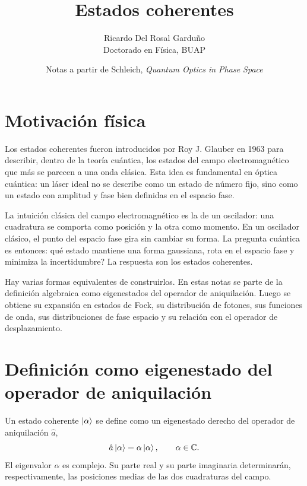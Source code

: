 \documentclass[11pt]{article}
\title{Estados coherentes}
\author{Ricardo Del Rosal Gardu\~no \\ \small Doctorado en F\'isica, BUAP}
\date{Notas a partir de Schleich, \emph{Quantum Optics in Phase Space}}
\begin{document}
\maketitle

\section{Motivaci\'on f\'isica}

Los estados coherentes fueron introducidos por Roy J. Glauber en 1963 para
describir, dentro de la teor\'ia cu\'antica, los estados del campo
electromagn\'etico que m\'as se parecen a una onda cl\'asica. Esta idea es
fundamental en \'optica cu\'antica: un l\'aser ideal no se describe como un
estado de n\'umero fijo, sino como un estado con amplitud y fase bien
definidas en el espacio fase.

La intuici\'on cl\'asica del campo electromagn\'etico es la de un oscilador:
una cuadratura se comporta como posici\'on y la otra como momento. En un
oscilador cl\'asico, el punto del espacio fase gira sin cambiar su forma. La
pregunta cu\'antica es entonces: \textquestiondown qu\'e estado mantiene una
forma gaussiana, rota en el espacio fase y minimiza la incertidumbre? La
respuesta son los estados coherentes.

Hay varias formas equivalentes de construirlos. En estas notas se parte de la
definici\'on algebraica como eigenestados del operador de aniquilaci\'on. Luego
se obtiene su expansi\'on en estados de Fock, su distribuci\'on de fotones, sus
funciones de onda, sus distribuciones de fase espacio y su relaci\'on con el
operador de desplazamiento.

\section{Definici\'on como eigenestado del operador de aniquilaci\'on}

Un estado coherente $\ket{\alpha}$ se define como un eigenestado derecho del
operador de aniquilaci\'on $\hat a$,
\begin{equation}
  \hat a\ket{\alpha}=\alpha\ket{\alpha},
  \qquad \alpha\in\mathbb C.
\end{equation}
El eigenvalor $\alpha$ es complejo. Su parte real y su parte imaginaria
determinar\'an, respectivamente, las posiciones medias de las dos cuadraturas
del campo.
\end{document}
